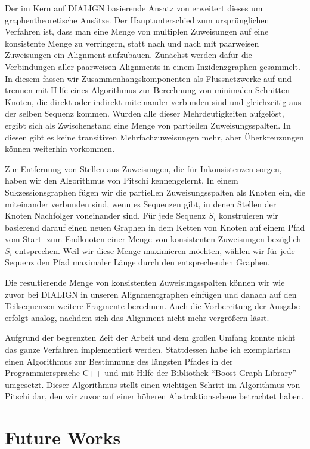Der im Kern auf DIALIGN basierende Ansatz von \cite{cpm10} erweitert dieses um graphentheoretische Ansätze. Der Hauptunterschied zum ursprünglichen Verfahren ist, dass man eine Menge von multiplen Zuweisungen auf eine konsistente Menge zu verringern, statt nach und nach mit paarweisen Zuweisungen ein Alignment aufzubauen. Zunächst werden dafür die Verbindungen aller paarweisen Alignments in einem Inzidenzgraphen gesammelt. In diesem fassen wir Zusammenhangskomponenten als Flussnetzwerke auf und trennen mit Hilfe eines Algorithmus zur Berechnung von minimalen Schnitten Knoten, die direkt oder indirekt miteinander verbunden sind und gleichzeitig aus der selben Sequenz kommen. Wurden alle dieser Mehrdeutigkeiten aufgelöst, ergibt sich als Zwischenstand eine Menge von partiellen Zuweisungsspalten. In diesen gibt es keine transitiven Mehrfachzuweisungen mehr, aber Überkreuzungen können weiterhin vorkommen. 

Zur Entfernung von Stellen aus Zuweisungen, die für Inkonsistenzen sorgen, haben wir den Algorithmus von Pitschi kennengelernt. In einem Sukzessionsgraphen fügen wir die partiellen Zuweisungsspalten als Knoten ein, die miteinander verbunden sind, wenn es Sequenzen gibt, in denen Stellen der Knoten Nachfolger voneinander sind. Für jede Sequenz $S_i$ konstruieren wir basierend darauf einen neuen Graphen in dem Ketten von Knoten auf einem Pfad vom Start- zum Endknoten einer Menge von konsistenten Zuweisungen bezüglich $S_i$ entsprechen. Weil wir diese Menge maximieren möchten, wählen wir für jede Sequenz den Pfad maximaler Länge durch den entsprechenden Graphen.

Die resultierende Menge von konsistenten Zuweisungsspalten können wir wie zuvor bei DIALIGN in unseren Alignmentgraphen einfügen und danach auf den Teilsequenzen weitere Fragmente berechnen. Auch die Vorbereitung der Ausgabe erfolgt analog, nachdem sich das Alignment nicht mehr vergrößern lässt.

Aufgrund der begrenzten Zeit der Arbeit und dem großen Umfang konnte nicht das ganze Verfahren implementiert werden. Stattdessen habe ich exemplarisch einen Algorithmus zur Bestimmung des längsten Pfades in der Programmiersprache C++ und mit Hilfe der Bibliothek \enquote{Boost Graph Library} umgesetzt. Dieser Algorithmus stellt einen wichtigen Schritt im Algorithmus von Pitschi dar, den wir zuvor auf einer höheren Abstraktionsebene betrachtet haben. 

\section{Future Works} \label{sec:fut_work}


